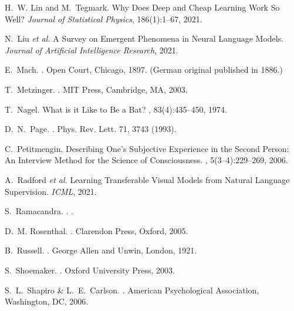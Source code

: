 \documentclass[12pt,a4paper]{article}
\begin{document}
\begin{thebibliography}{99}
H.~W. Lin and M.~Tegmark.
\newblock Why Does Deep and Cheap Learning Work So Well?
\newblock \emph{Journal of Statistical Physics}, 186(1):1--67, 2021.

N.~Liu \emph{et al.}
\newblock A Survey on Emergent Phenomena in Neural Language Models.
\newblock \emph{Journal of Artificial Intelligence Research}, 2021.

E.~Mach.
.
\newblock Open Court, Chicago, 1897.
\newblock (German original published in 1886.)

T.~Metzinger.
.
\newblock MIT Press, Cambridge, MA, 2003.

T.~Nagel.
\newblock What is it Like to Be a Bat?
, 83(4):435--450, 1974.

D.~N.~Page.
.
\newblock Phys. Rev. Lett. 71, 3743 (1993).

C.~Petitmengin.
\newblock Describing One’s Subjective Experience in the Second Person: An Interview Method for the Science of Consciousness.
, 5(3--4):229--269, 2006.

A.~Radford \emph{et al.}
\newblock Learning Transferable Visual Models from Natural Language Supervision.
\newblock \emph{ICML}, 2021.

S.~Ramacandra.
.
.

D.~M. Rosenthal.
.
\newblock Clarendon Press, Oxford, 2005.

B.~Russell.
.
\newblock George Allen and Unwin, London, 1921.

S.~Shoemaker.
.
\newblock Oxford University Press, 2003.

S.~L.~Shapiro \& L.~E.~Carlson.
.
\newblock American Psychological Association, Washington, DC, 2006.


\end{thebibliography}
\end{document}
